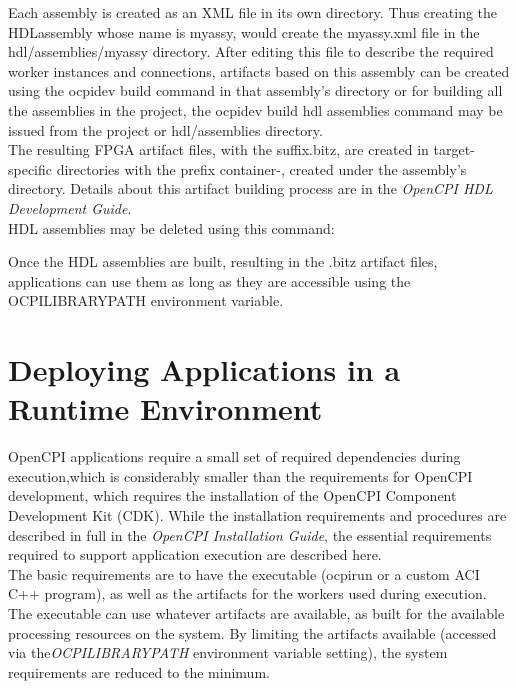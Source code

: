 \documentclass[10pt, a4paper, oneside]{article}
\renewcommand\_{\textunderscore\allowbreak} %
\begin{document}
Each assembly is created as an XML file in its own directory.  Thus creating the HDLassembly whose name is myassy, would create the myassy.xml file in the hdl/assemblies/myassy directory. After editing this file to describe the required worker instances and connections, artifacts based on this assembly can be created using the ocpidev build command in that assembly's directory or for building all the assemblies in the project, the ocpidev build hdl assemblies command may be issued from the project or hdl/assemblies directory.\\

The resulting FPGA artifact files, with the suffix.bitz, are created in target-specific directories with the prefix container-, created under the assembly's directory.
Details about this artifact building process are in the \emph{OpenCPI HDL Development Guide}. \\

HDL assemblies may be deleted using this command:
\begin{ocpixml}
\end{ocpixml} 
Once the HDL assemblies are built, resulting in the .bitz artifact files, applications can use them as long as they are accessible using the OCPI\_LIBRARY\_PATH environment variable.
\section{Deploying Applications in a Runtime Environment}\label{Deploying Applications in a Runtime Environment}OpenCPI applications require a small set of required dependencies during execution,which is considerably smaller than the requirements for OpenCPI development, which requires the installation of the OpenCPI Component Development Kit (CDK).  While the installation requirements and procedures are described in full in the \emph{OpenCPI Installation Guide}, the essential requirements required to support application execution are described here.\\

The basic requirements are to have the executable (ocpirun or a custom ACI C++ program), as well as the artifacts for the workers used during execution.  The executable can use whatever artifacts are available, as built for the available processing resources on the system.  By limiting the artifacts available (accessed via the\emph{OCPI\_LIBRARY\_PATH} environment variable setting), the system requirements are reduced to the minimum. \\
\end{document}
